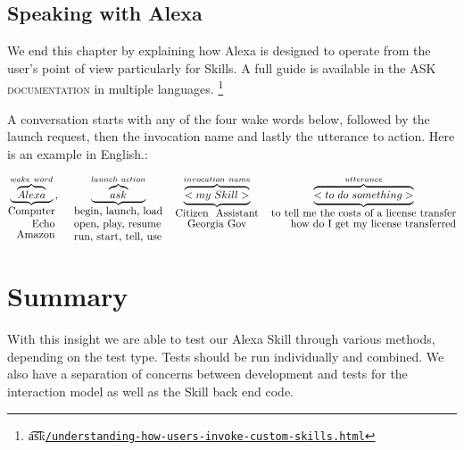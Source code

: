 





\subsection*{Speaking with Alexa}


We end this chapter by explaining how Alexa is designed to operate from the user's point of view particularly for Skills. A full guide is available in the \textsc{ASK documentation} in multiple languages. \footnote{\t{a\t{sk}}\href{https://developer.amazon.com/docs/custom-skills/understanding-how-users-invoke-custom-skills.html}{\lstinline|/understanding-how-users-invoke-custom-skills.html|}}

A conversation starts with any of the four wake words below, followed by the launch request, then the invocation name and lastly the utterance to action. Here is an example in English.:


\[
	\underbrace{\overbrace{Alexa}^{wake \  word}}_{\shortstack[r]{Computer\\Echo\\Amazon}} %
	, \ \ \ \ 
	\underbrace{\overbrace{ask}^{launch \ action}}_{\shortstack[l]{begin, launch, load\\open, play, resume\\run, start, tell, use}}
	\ \ \ 
	\underbrace{\overbrace{<my \ Skill>}^{invocation \ name}}_{\shortstack{Citizen \ Assistant \\ Georgia Gov}}
	\ \ \
	\underbrace{\overbrace{<to \ do \ something>}^{utterance}}_{\shortstack[r]{to tell me the costs of a license transfer\\how do I get my license transferred}}
\]






\section{Summary}

With this insight we are able to test our Alexa Skill through various methods, depending on the test type. Tests should be run individually and combined. We also have a separation of concerns between development and tests for the interaction model as well as the Skill back end code.





